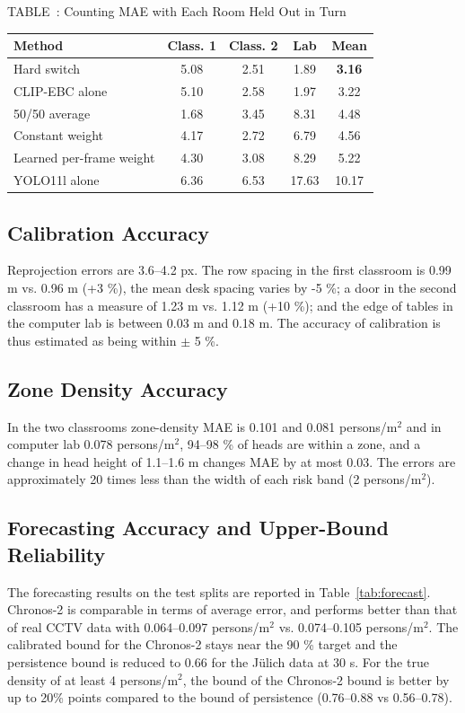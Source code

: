 \documentclass[conference]{IEEEtran}
\newcommand{\pmsq}{persons/m$^2$}
\newcommand{\CStabcap}[2]{\refstepcounter{table}\label{#2}{\centering\footnotesize TABLE~\thetable: #1\par}\vspace{4pt}}
\begin{document}
\begin{table}[!t]
\CStabcap{Counting MAE with Each Room Held Out in Turn}{tab:fusion}
\centering
\scriptsize
\begin{tabular}{@{}lcccc@{}}
\toprule
Method & Class. 1 & Class. 2 & Lab & Mean \\
\midrule
Hard switch & 5.08 & 2.51 & 1.89 & \textbf{3.16} \\
CLIP-EBC alone & 5.10 & 2.58 & 1.97 & 3.22 \\
50/50 average & 1.68 & 3.45 & 8.31 & 4.48 \\
Constant weight & 4.17 & 2.72 & 6.79 & 4.56 \\
Learned per-frame weight & 4.30 & 3.08 & 8.29 & 5.22 \\
YOLO11l alone & 6.36 & 6.53 & 17.63 & 10.17 \\
\bottomrule
\end{tabular}
\end{table}

\subsection{Calibration Accuracy}
Reprojection errors are 3.6--4.2 px. The row spacing in the first classroom is 0.99 m vs. 0.96 m (+3 \%), the mean desk spacing varies by -5 \%; a door in the second classroom has a measure of 1.23 m vs. 1.12 m (+10 \%); and the edge of tables in the computer lab is between 0.03 m and 0.18 m. The accuracy of calibration is thus estimated as being within $\pm$ 5 \%.

\subsection{Zone Density Accuracy}
In the two classrooms zone-density MAE is 0.101 and 0.081 \pmsq{} and in computer lab 0.078 \pmsq{}, 94--98 \% of heads are within a zone, and a change in head height of 1.1--1.6 m changes MAE by at most 0.03. The errors are approximately 20 times less than the width of each risk band (2 \pmsq{}).

\subsection{Forecasting Accuracy and Upper-Bound Reliability}
\label{sec:forecast}
The forecasting results on the test splits are reported in Table~\ref{tab:forecast}. Chronos-2 is comparable in terms of average error, and performs better than that of real CCTV data with 0.064--0.097 \pmsq{} vs. 0.074--0.105 \pmsq{}. The calibrated bound for the Chronos-2 stays near the 90 \% target and the persistence bound is reduced to 0.66 for the J\"ulich data at 30 s. For the true density of at least 4 \pmsq{}, the bound of the Chronos-2 bound is better by up to 20\% points compared to the bound of persistence (0.76--0.88 vs 0.56--0.78).
\end{document}
